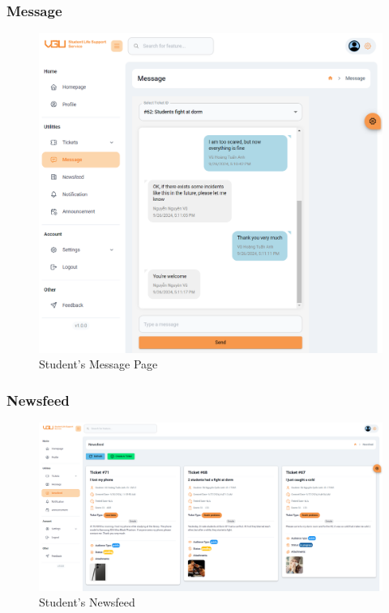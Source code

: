 	\subsubsection{Message}
	\begin{figure}[H]
		\centering
		\includegraphics[width=1.0\linewidth]{graphics/gui/student/msg}
		\caption{Student's Message Page}
		\label{fig:msg}
	\end{figure}
	
	
	
	\subsubsection{Newsfeed}
	\begin{figure}[H]
		\centering
		\includegraphics[width=1.0\linewidth]{graphics/gui/student/newsfeed}
		\caption{Student's Newsfeed}
		\label{fig:gui-std-newsfeed}
	\end{figure}
	

